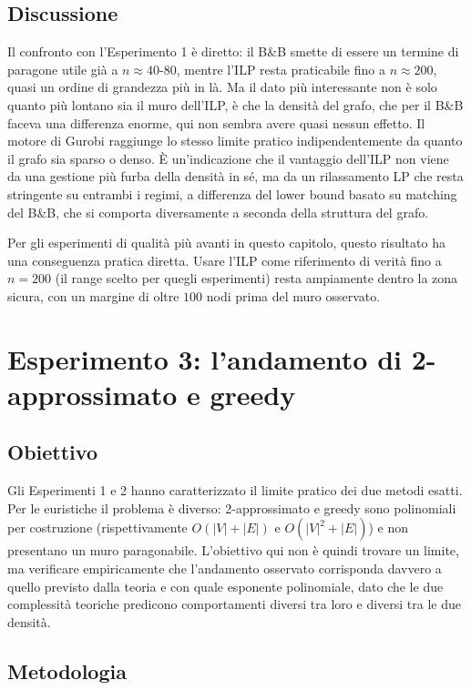 \subsection{Discussione}

Il confronto con l'Esperimento 1 è diretto: il B\&B smette di essere un termine di paragone utile già a $n\approx 40$-$80$, mentre l'ILP resta praticabile fino a $n\approx 200$, quasi un ordine di grandezza più in là. 
Ma il dato più interessante non è solo quanto più lontano sia il muro dell'ILP, 
è che la densità del grafo, che per il B\&B faceva una differenza enorme, qui non sembra avere quasi nessun effetto. 
Il motore di Gurobi raggiunge lo stesso limite pratico indipendentemente da quanto il grafo sia sparso o denso. 
È un'indicazione che il vantaggio dell'ILP non viene da una gestione più furba della densità in sé, ma da un rilassamento LP che resta stringente su entrambi i regimi, 
a differenza del lower bound basato su matching del B\&B, che si comporta diversamente a seconda della struttura del grafo.

Per gli esperimenti di qualità più avanti in questo capitolo, questo risultato ha una conseguenza pratica diretta. 
Usare l'ILP come riferimento di verità fino a $n=200$ (il range scelto per quegli esperimenti) resta ampiamente dentro la zona sicura, 
con un margine di oltre $100$ nodi prima del muro osservato.

\section{Esperimento 3: l'andamento di 2-approssimato e greedy}

\subsection{Obiettivo}

Gli Esperimenti 1 e 2 hanno caratterizzato il limite pratico dei due metodi esatti. 
Per le euristiche il problema è diverso: 2-approssimato e greedy sono polinomiali per costruzione (rispettivamente $O(|V|+|E|)$ e $O(|V|^2+|E|)$) e non presentano un muro paragonabile. 
L'obiettivo qui non è quindi trovare un limite, ma verificare empiricamente che l'andamento osservato corrisponda davvero a quello previsto dalla teoria e con quale esponente polinomiale, 
dato che le due complessità teoriche predicono comportamenti diversi tra loro e diversi tra le due densità.

\subsection{Metodologia}

